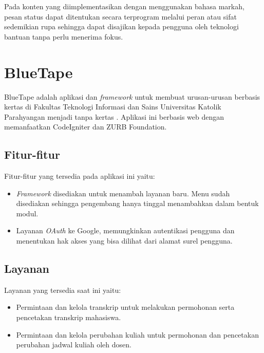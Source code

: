 Pada konten yang diimplementasikan dengan menggunakan bahasa markah, pesan status dapat ditentukan secara terprogram melalui peran atau sifat sedemikian rupa sehingga dapat disajikan kepada pengguna oleh teknologi bantuan tanpa perlu menerima fokus.



\section{BlueTape}
\label{sec:bluetape}
BlueTape adalah aplikasi dan \textit{framework} untuk membuat urusan-urusan berbasis kertas di Fakultas Teknologi Informasi dan Sains Universitas Katolik Parahyangan menjadi tanpa kertas \cite{BlueTape}. Aplikasi ini berbasis web dengan memanfaatkan CodeIgniter dan ZURB Foundation.

\subsection{Fitur-fitur}
\label{sec:bluetape_fitur}
Fitur-fitur yang tersedia pada aplikasi ini yaitu:
\begin{itemize}
	\item \textit{Framework} disediakan untuk menambah layanan baru. Menu sudah disediakan sehingga pengembang hanya tinggal menambahkan dalam bentuk modul.
	\item Layanan \textit{OAuth} ke Google, memungkinkan autentikasi pengguna dan menentukan hak akses yang bisa dilihat dari alamat surel pengguna.
\end{itemize}

\subsection{Layanan}
\label{sec:bluetape_layanan}
Layanan yang tersedia saat ini yaitu:
\begin{itemize}
	\item Permintaan dan kelola transkrip untuk melakukan permohonan serta pencetakan transkrip mahasiswa.
	\item Permintaan dan kelola perubahan kuliah untuk permohonan dan pencetakan perubahan jadwal kuliah oleh dosen.
\end{itemize}

